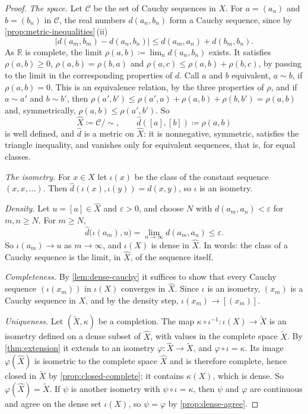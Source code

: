 \begin{proof}
\emph{The space.} Let $\mathcal C$ be the set of Cauchy sequences in $X$. For $a=(a_n)$ and $b=(b_n)$ in $\mathcal C$, the real numbers $d(a_n,b_n)$ form a Cauchy sequence, since by \cref{prop:metric-inequalities}\,(ii)
\[
|d(a_m,b_m)-d(a_n,b_n)|\le d(a_m,a_n)+d(b_m,b_n) .
\]
As $\mathbb R$ is complete, the limit $\rho(a,b)\coloneqq\lim_nd(a_n,b_n)$ exists. It satisfies $\rho(a,b)\ge0$, $\rho(a,b)=\rho(b,a)$ and $\rho(a,c)\le\rho(a,b)+\rho(b,c)$, by passing to the limit in the corresponding properties of $d$. Call $a$ and $b$ equivalent, $a\sim b$, if $\rho(a,b)=0$. This is an equivalence relation, by the three properties of $\rho$, and if $a\sim a'$ and $b\sim b'$, then $\rho(a',b')\le\rho(a',a)+\rho(a,b)+\rho(b,b')=\rho(a,b)$ and, symmetrically, $\rho(a,b)\le\rho(a',b')$. So
\[
\hat X\coloneqq\mathcal C/{\sim},\qquad\hat d([a],[b])\coloneqq\rho(a,b)
\]
is well defined, and $\hat d$ is a metric on $\hat X$: it is nonnegative, symmetric, satisfies the triangle inequality, and vanishes only for equivalent sequences, that is, for equal classes.

\emph{The isometry.} For $x\in X$ let $\iota(x)$ be the class of the constant sequence $(x,x,\ldots)$. Then $\hat d(\iota(x),\iota(y))=d(x,y)$, so $\iota$ is an isometry.

\emph{Density.} Let $u=[a]\in\hat X$ and $\varepsilon>0$, and choose $N$ with $d(a_m,a_n)<\varepsilon$ for $m,n\ge N$. For $m\ge N$,
\[
\hat d\bigl(\iota(a_m),u\bigr)=\lim_{n\to\infty}d(a_m,a_n)\le\varepsilon .
\]
So $\iota(a_m)\to u$ as $m\to\infty$, and $\iota(X)$ is dense in $\hat X$. In words: the class of a Cauchy sequence is the limit, in $\hat X$, of the sequence itself.

\emph{Completeness.} By \cref{lem:dense-cauchy} it suffices to show that every Cauchy sequence $(\iota(x_m))$ in $\iota(X)$ converges in $\hat X$. Since $\iota$ is an isometry, $(x_m)$ is a Cauchy sequence in $X$, and by the density step, $\iota(x_m)\to[(x_m)]$.

\emph{Uniqueness.} Let $(\tilde X,\kappa)$ be a completion. The map $\kappa\circ\iota^{-1}\colon\iota(X)\to\tilde X$ is an isometry defined on a dense subset of $\hat X$, with values in the complete space $\tilde X$. By \cref{thm:extension} it extends to an isometry $\varphi\colon\hat X\to\tilde X$, and $\varphi\circ\iota=\kappa$. Its image $\varphi(\hat X)$ is isometric to the complete space $\hat X$ and is therefore complete, hence closed in $\tilde X$ by \cref{prop:closed-complete}; it contains $\kappa(X)$, which is dense. So $\varphi(\hat X)=\tilde X$. If $\psi$ is another isometry with $\psi\circ\iota=\kappa$, then $\psi$ and $\varphi$ are continuous and agree on the dense set $\iota(X)$, so $\psi=\varphi$ by \cref{prop:dense-agree}.
\end{proof}

